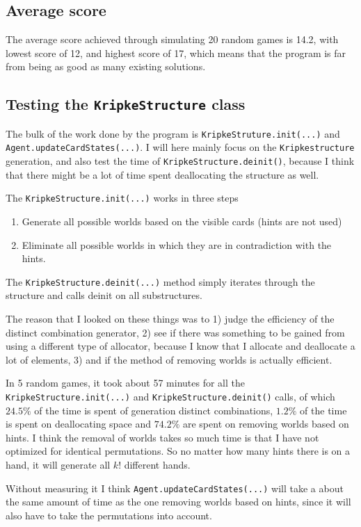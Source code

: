 \subsection{Average score}
The average score achieved through simulating 20 random games is 14.2, with lowest score of 12, and highest score of 17, which means that the program is far from being as good as many existing solutions.

\subsection{Testing the {\tt KripkeStructure} class} \label{sec:testing-kripkestructure-class}
The bulk of the work done by the program is {\tt KripkeStruture.init(...)} and {\tt Agent.updateCardStates(...)}. I will here mainly focus on the {\tt Kripkestructure} generation, and also test the time of {\tt KripkeStructure.deinit()}, because I think that there might be a lot of time spent deallocating the structure as well.

The {\tt KripkeStructure.init(...)} works in three steps
\begin{enumerate}
	\item Generate all possible worlds based on the visible cards (hints are not used)
	\item Eliminate all possible worlds in which they are in contradiction with the hints.
\end{enumerate}

The {\tt KripkeStructure.deinit(...)} method simply iterates through the structure and calls deinit on all substructures.

The reason that I looked on these things was to 1) judge the efficiency of the distinct combination generator, 2) see if there was something to be gained from using a different type of allocator, because I know that I allocate and deallocate a lot of elements, 3) and if the method of removing worlds is actually efficient.

In 5 random games, it took about 57 minutes for all the {\tt KripkeStructure.init(...)} and {\tt KripkeStructure.deinit()} calls,
of which $24.5\%$ of the time is spent of generation distinct combinations, $1.2\%$ of the time is spent on deallocating space and $74.2\%$ are spent on removing worlds based on hints. I think the removal of worlds takes so much time is that I have not optimized for identical permutations. So no matter how many hints there is on a hand, it will generate all $k!$ different hands.

Without measuring it I think {\tt Agent.updateCardStates(...)} will take a about the same amount of time as the one removing worlds based on hints, since it will also have to take the permutations into account.



